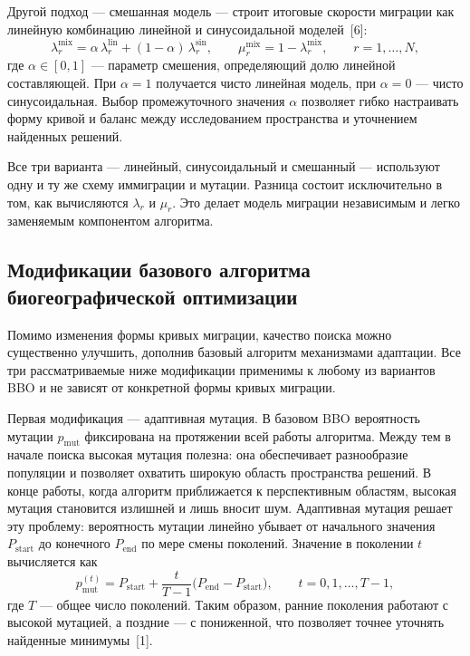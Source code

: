 \documentclass[14pt, russian]{scrartcl}
\begin{document}
Другой подход --- смешанная модель --- строит итоговые скорости миграции
как линейную комбинацию линейной и синусоидальной моделей~[6]:
\begin{equation}
    \lambda_r^{\text{mix}} =
      \alpha\, \lambda_r^{\text{lin}} +
      (1 - \alpha)\, \lambda_r^{\text{sin}},
    \qquad
    \mu_r^{\text{mix}} = 1 - \lambda_r^{\text{mix}},
    \qquad r = 1, \dots, N,
\end{equation}
где $\alpha \in [0, 1]$ --- параметр смешения, определяющий долю
линейной составляющей. При $\alpha = 1$ получается чисто линейная
модель, при $\alpha = 0$ --- чисто синусоидальная. Выбор промежуточного
значения $\alpha$ позволяет гибко настраивать форму кривой и баланс
между исследованием пространства и уточнением найденных
решений.

Все три варианта --- линейный, синусоидальный и смешанный --- используют
одну и ту же схему иммиграции и мутации. Разница состоит исключительно
в том, как вычисляются $\lambda_r$ и $\mu_r$. Это делает модель
миграции независимым и легко заменяемым компонентом алгоритма.

\subsection{Модификации базового алгоритма биогеографической оптимизации}

Помимо изменения формы кривых миграции, качество поиска можно
существенно улучшить, дополнив базовый алгоритм механизмами адаптации.
Все три рассматриваемые ниже модификации применимы к любому из вариантов
BBO и не зависят от конкретной формы кривых миграции.

Первая модификация --- адаптивная мутация. В базовом BBO вероятность
мутации $p_{\text{mut}}$ фиксирована на протяжении всей работы
алгоритма. Между тем в начале поиска высокая мутация полезна: она
обеспечивает разнообразие популяции и позволяет охватить широкую
область пространства решений. В конце работы, когда алгоритм
приближается к перспективным областям, высокая мутация становится
излишней и лишь вносит шум. Адаптивная мутация решает эту проблему:
вероятность мутации линейно убывает от начального значения
$P_{\text{start}}$ до конечного $P_{\text{end}}$ по мере смены
поколений. Значение в поколении $t$ вычисляется как
\begin{equation}
    p_{\text{mut}}^{(t)} = P_{\text{start}} +
    \frac{t}{T - 1}\bigl(P_{\text{end}} - P_{\text{start}}\bigr),
    \qquad t = 0, 1, \dots, T-1,
\end{equation}
где $T$ --- общее число поколений. Таким образом, ранние поколения
работают с высокой мутацией, а поздние --- с пониженной, что позволяет
точнее уточнять найденные минимумы~[1].
\end{document}
